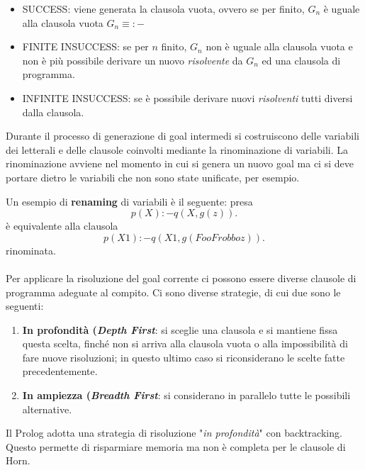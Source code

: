 \documentclass[11pt]{article}
\begin{document}
\begin{itemize}
	\item SUCCESS: viene generata la clausola vuota, ovvero se per  finito, $G_n$ è uguale alla clausola vuota $G_n \equiv :- $
	\item FINITE INSUCCESS: se per $n$ finito, $G_n$ non è uguale alla clausola vuota e non è più possibile derivare un nuovo \textit{risolvente} da $G_n$ ed una clausola di programma.
	\item INFINITE INSUCCESS: se è possibile derivare nuovi \textit{risolventi} tutti diversi dalla clausola.
\end{itemize}
Durante il processo di generazione di goal intermedi si costruiscono delle variabili dei letterali e delle clausole coinvolti mediante la rinominazione di variabili.
La rinominazione avviene nel momento in cui si genera un nuovo goal ma ci si deve portare dietro le variabili che non sono state unificate, per esempio. 

Un esempio di \textbf{renaming} di variabili è il seguente: presa
$$p(X) :- q(X, g(z)). $$
è equivalente alla clausola 
$$p(X1) :- q(X1, g(FooFrobboz)). $$
rinominata.
\\ \\
Per applicare la risoluzione del goal corrente ci possono essere diverse clausole di programma adeguate al compito. Ci sono diverse strategie, di cui due sono le seguenti:
\begin{enumerate}
	\item \textbf{In profondità (\textit{Depth First}}: si sceglie una clausola e si mantiene fissa questa scelta, finché non si arriva alla clausola vuota o alla impossibilità di fare nuove risoluzioni; in questo ultimo caso si riconsiderano le scelte fatte precedentemente.
	\item \textbf{In ampiezza (\textit{Breadth First}}: si considerano in parallelo tutte le possibili alternative.
\end{enumerate}
Il Prolog adotta una strategia di risoluzione "\textit{in profondità}" con \color{blue} backtracking\color{black}. Questo permette di risparmiare memoria ma non è completa per le clausole di Horn.
\end{document}
